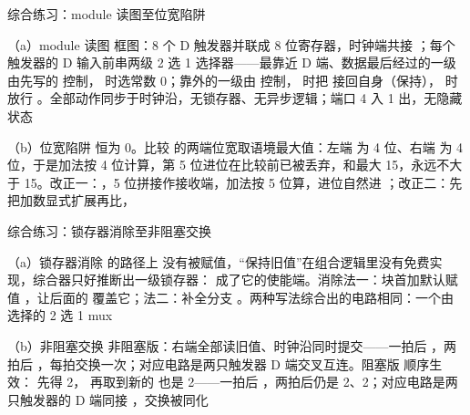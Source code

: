 \begin{chapteranswer}{综合练习：module 读图至位宽陷阱}
\begin{answersubproblem}{（a）module 读图}
框图：8 个 D 触发器并联成 8 位寄存器，时钟端共接 ；每个触发器的 D 输入前串两级 2 选 1 选择器——最靠近 D 端、数据最后经过的一级由先写的  控制， 时选常数 0；靠外的一级由  控制， 时把  接回自身（保持）， 时放行 。全部动作同步于时钟沿，无锁存器、无异步逻辑；端口 4 入 1 出，无隐藏状态
\end{answersubproblem}
\begin{answersubproblem}{（b）位宽陷阱}
 恒为 0。比较 \code{>} 的两端位宽取语境最大值：左端  为 4 位、右端  为 4 位，于是加法按 4 位计算，第 5 位进位在比较前已被丢弃，和最大 15，永远不大于 15。改正一：，5 位拼接作接收端，加法按 5 位算，进位自然进 ；改正二：先把加数显式扩展再比，
\end{answersubproblem}
\end{chapteranswer}

\begin{chapteranswer}{综合练习：锁存器消除至非阻塞交换}
\begin{answersubproblem}{（a）锁存器消除}
 的路径上  没有被赋值，“保持旧值”在组合逻辑里没有免费实现，综合器只好推断出一级锁存器： 成了它的使能端。消除法一：块首加默认赋值 ，让后面的  覆盖它；法二：补全分支 。两种写法综合出的电路相同：一个由  选择的 2 选 1 mux
\end{answersubproblem}
\begin{answersubproblem}{（b）非阻塞交换}
非阻塞版：右端全部读旧值、时钟沿同时提交——一拍后 ，两拍后 ，每拍交换一次；对应电路是两只触发器 D 端交叉互连。阻塞版  顺序生效： 先得 2， 再取到新的  也是 2——一拍后 ，两拍后仍是 2、2；对应电路是两只触发器的 D 端同接 ，交换被同化
\end{answersubproblem}
\end{chapteranswer}

